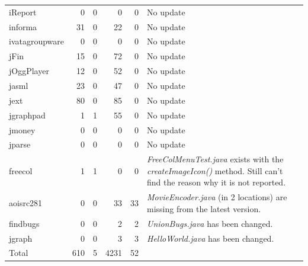 \documentclass{IEEEtran}
\begin{document}
\begin{table}[H]
\begin{tabular}{l|r|r|r|r|p{6cm}}
	iReport		& 0		& 0 	& 0		& 0 & No update \\
	informa		& 31	& 0 	& 22	& 0 & No update \\
	ivatagroupware	& 0	& 0		& 0		& 0 & No update \\
	jFin		& 15	& 0		& 72	& 0 & No update \\
	jOggPlayer	& 12 	& 0		& 52	& 0 & No update \\
	jasml		& 23	& 0		& 47	& 0 & No update \\
	jext		& 80	& 0		& 85	& 0 & No update \\
	jgraphpad	& 1		& 1		& 55	& 0 & No update \\
	jmoney		& 0		& 0		& 0		& 0 & No update \\
	jparse		& 0		& 0		& 0		& 0 & No update \\
	\hline
	freecol		& 1		& 1		& 0		& 0		& \textit{FreeColMenuTest.java} exists with the \textit{createImageIcon()} method. Still can't find the reason why it is not reported. \\		
	aoisrc281	& 0		& 0		& 33	& 33 	& \textit{MovieEncoder.java} (in 2 locations) are missing from the latest version. \\
	findbugs	& 0		& 0		& 2		& 2 	& \textit{UnionBugs.java} has been changed. \\
	jgraph		& 0		& 0		& 3		& 3 	& \textit{HelloWorld.java} has been changed. \\
	\hline
	Total		& 610	& 5		& 4231	& 52 	&\\
	\hline
\end{tabular}
\end{table}
\end{document}

